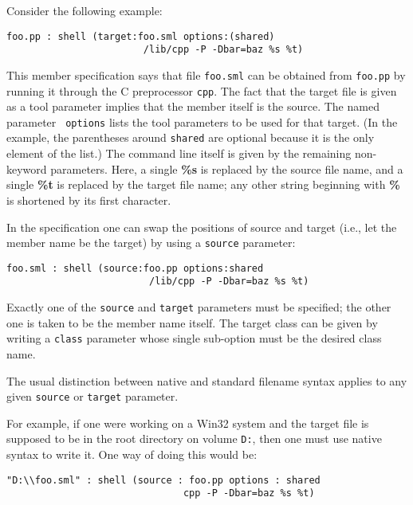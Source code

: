 Consider the following example:

\begin{lstlisting}[language=CM]
  foo.pp : shell (target:foo.sml options:(shared)
                        /lib/cpp -P -Dbar=baz %s %t)
\end{lstlisting}%

This member specification says that file {\tt foo.sml} can be obtained
from {\tt foo.pp} by running it through the C preprocessor {\tt cpp}.
The fact that the target file is given as a tool parameter implies
that the member itself is the source.  The named parameter {\tt
options} lists the tool parameters to be used for that target. (In the
example, the parentheses around {\tt shared} are optional because it
is the only element of the list.) The command line itself is given by
the remaining non-keyword parameters.  Here, a single {\bf \%s} is
replaced by the source file name, and a single {\bf \%t} is replaced
by the target file name; any other string beginning with {\bf \%} is
shortened by its first character.

In the specification one can swap the positions of source and target
(i.e., let the member name be the target) by using a {\tt source}
parameter:

\begin{lstlisting}[language=CM]
  foo.sml : shell (source:foo.pp options:shared
                         /lib/cpp -P -Dbar=baz %s %t)
\end{lstlisting}%

Exactly one of the {\tt source} and {\tt target} parameters must be
specified; the other one is taken to be the member name itself.  The
target class can be given by writing a {\tt class} parameter whose
single sub-option must be the desired class name.

The usual distinction between native and standard filename syntax
applies to any given {\tt source} or {\tt target} parameter.

For example, if one were working on a Win32 system and the target file
is supposed to be in the root directory on volume {\tt D:},
then one must use native syntax to write it.  One way of doing this
would be:

\begin{lstlisting}[language=CM]
  "D:\\foo.sml" : shell (source : foo.pp options : shared
                               cpp -P -Dbar=baz %s %t)
\end{lstlisting}%

